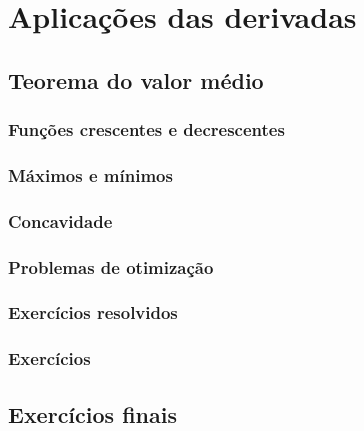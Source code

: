 
\chapter{Aplicações das derivadas}\label{cap:apl_derivadas}

\emconstrucao

\section{Teorema do valor médio}
\subsection{Funções crescentes e decrescentes}
\subsection{Máximos e mínimos}
\subsection{Concavidade}
\subsection{Problemas de otimização}


\construirSec

\subsection*{Exercícios resolvidos}

\construirExeresol


\subsection*{Exercícios}

\construirExer


\section{Exercícios finais}

\construirExer


